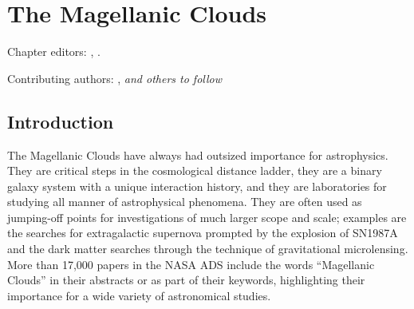 
\chapter[MCs]{The Magellanic Clouds}
\def\chpname{mc}\label{chp:\chpname}

Chapter editors:
,
.

Contributing authors:
,
{\it and others to follow}


\section{Introduction}
\label{sec:\chpname:intro}




The Magellanic Clouds have always had outsized importance for
astrophysics.  They are critical steps in the cosmological distance
ladder, they are a binary galaxy system with a unique interaction
history, and they are laboratories for studying all manner of
astrophysical phenomena.  They are often used as jumping-off points
for investigations of much larger scope and scale; examples are the
searches for extragalactic supernova prompted by the explosion of
SN1987A and the dark matter searches through the technique of
gravitational microlensing.  More than 17,000 papers in the NASA ADS
include the words ``Magellanic Clouds'' in their abstracts or as part
of their keywords, highlighting their importance for a wide variety of
astronomical studies.

